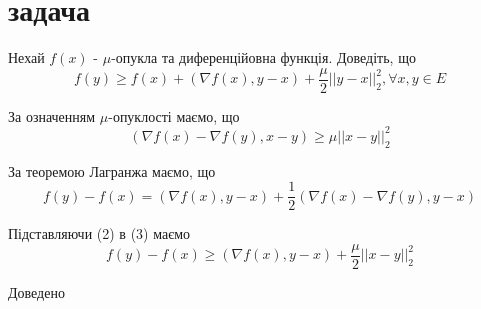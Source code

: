 \section{задача}


\begin{tcolorbox}[title = Умова]
    Нехай $f(x)$ - $\mu$-опукла та диференційовна функція. Доведіть, що 
    \begin{equation}
        f(y) \geq f(x) + (\nabla f(x) , y - x) + \frac{\mu}{2} ||y - x||_2^2, \forall x, y \in E
    \end{equation}
\end{tcolorbox}

За означенням $\mu$-опуклості маємо, що 
\begin{equation}
    (\nabla f(x) - \nabla f(y), x - y) \geq \mu ||x - y||_2^2
\end{equation}

За теоремою Лагранжа маємо, що
\begin{equation}
    f(y) - f(x) = (\nabla f(x), y - x) + \frac{1}{2} (\nabla f(x) - \nabla f(y), y - x)
\end{equation}

Підставляючи (2) в (3) маємо
\begin{equation}
    f(y) - f(x) \geq (\nabla f(x), y - x) + \frac{\mu}{2} ||x - y||_2^2
\end{equation}

Доведено